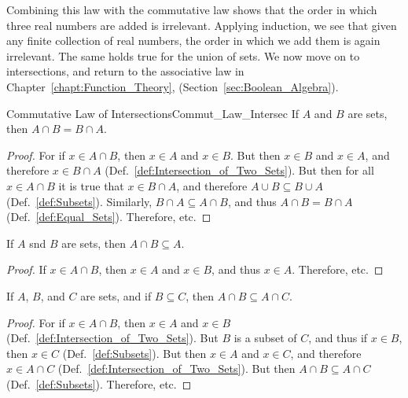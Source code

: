         Combining this law with the commutative law shows that the order in
        which three real numbers are added is irrelevant. Applying induction, we
        see that given any finite collection of real numbers, the order in
        which we add them is again irrelevant. The same holds true for the union
        of sets. We now move on to intersections, and return to the associative
        law in Chapter~\ref{chapt:Function_Theory},
        (Section~\ref{sec:Boolean_Algebra}).
        \begin{ltheorem}{Commutative Law of Intersections}{Commut_Law_Intersec}
            If $A$ and $B$ are sets, then $A\cap{B}=B\cap{A}$.
        \end{ltheorem}
        \begin{proof}
            For if $x\in{A}\cap{B}$, then $x\in{A}$ and
            $x\in{B}$. But then $x\in{B}$ and $x\in{A}$,
            and therefore $x\in{B}\cap{A}$
            (Def.~\ref{def:Intersection_of_Two_Sets}). But then
            for all $x\in{A}\cap{B}$ it is true that
            $x\in{B}\cap{A}$, and therefore
            $A\cup{B}\subseteq{B}\cup{A}$
            (Def.~\ref{def:Subsets}). Similarly,
            $B\cap{A}\subseteq{A}\cap{B}$, and thus
            $A\cap{B}=B\cap{A}$ (Def.~\ref{def:Equal_Sets}).
            Therefore, etc.
        \end{proof}
        \begin{theorem}
            \label{thm:Intersection_is_Smaller}%
            If $A$ snd $B$ are sets, then
            $A\cap{B}\subseteq{A}$.
        \end{theorem}
        \begin{proof}
            If $x\in{A}\cap{B}$, then $x\in{A}$ and
            $x\in{B}$, and thus $x\in{A}$. Therefore, etc.
        \end{proof}
        \begin{theorem}
            \label{thm:Intersection_with_Lesser_Set}%
            If $A$, $B$, and $C$ are sets, and if
            $B\subseteq{C}$, then
            $A\cap{B}\subseteq{A}\cap{C}$.
        \end{theorem}
        \begin{proof}
            For if $x\in{A}\cap{B}$, then $x\in{A}$ and
            $x\in{B}$ (Def.~\ref{def:Intersection_of_Two_Sets}).
            But $B$ is a subset of $C$, and thus if
            $x\in{B}$, then $x\in{C}$
            (Def.~\ref{def:Subsets}). But then $x\in{A}$ and
            $x\in{C}$, and therefore $x\in{A}\cap{C}$
            (Def.~\ref{def:Intersection_of_Two_Sets}). But
            then $A\cap{B}\subseteq{A}\cap{C}$
            (Def.~\ref{def:Subsets}). Therefore, etc.
        \end{proof}

